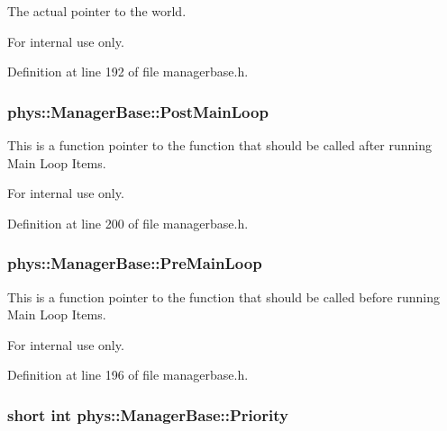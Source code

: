 The actual pointer to the world. 

\begin{DoxyInternal}{For internal use only.}
\end{DoxyInternal}


Definition at line 192 of file managerbase.h.

\hypertarget{classphys_1_1ManagerBase_aa1e80a30f151c07e06d1f4650f315da5}{
\subsubsection[{PostMainLoop}]{ {\bf phys::ManagerBase::PostMainLoop}}}
\label{d2/de3/classphys_1_1ManagerBase_aa1e80a30f151c07e06d1f4650f315da5}


This is a function pointer to the function that should be called after running Main Loop Items. 

\begin{DoxyInternal}{For internal use only.}
\end{DoxyInternal}


Definition at line 200 of file managerbase.h.

\hypertarget{classphys_1_1ManagerBase_a93eb2f1a30d913a4e99180b0965eb5db}{
\subsubsection[{PreMainLoop}]{ {\bf phys::ManagerBase::PreMainLoop}}}
\label{d2/de3/classphys_1_1ManagerBase_a93eb2f1a30d913a4e99180b0965eb5db}


This is a function pointer to the function that should be called before running Main Loop Items. 

\begin{DoxyInternal}{For internal use only.}
\end{DoxyInternal}


Definition at line 196 of file managerbase.h.

\hypertarget{classphys_1_1ManagerBase_a28e2690fbcf644a7780a53b81821d8ef}{
\subsubsection[{Priority}]{\setlength{\rightskip}{0pt plus 5cm}short int {\bf phys::ManagerBase::Priority}}}
\label{d2/de3/classphys_1_1ManagerBase_a28e2690fbcf644a7780a53b81821d8ef}


